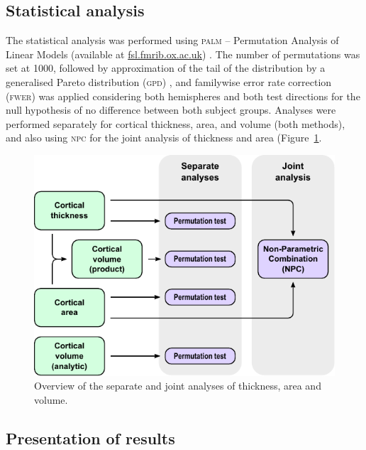 \subsection{Statistical analysis}

The statistical analysis was performed using \textsc{palm} -- Permutation Analysis of Linear Models (available at \href{http://fsl.fmrib.ox.ac.uk}{fsl.fmrib.ox.ac.uk}) \citep{Winkler2014, Winkler2016_npc}. The number of permutations was set at 1000, followed by approximation of the tail of the distribution by a generalised Pareto distribution (\textsc{gpd}) \citep{Winkler2016_fast}, and familywise error rate correction (\textsc{fwer}) was applied considering both hemispheres and both test directions for the null hypothesis of no difference between both subject groups. Analyses were performed separately for cortical thickness, area, and volume (both methods), and also using \textsc{npc} for the joint analysis of thickness and area (Figure~\ref{fig:flowstats}.

\begin{figure}[tp!]
\begin{center}
\includegraphics{figures/flowstats.pdf}
\caption{Overview of the separate and joint analyses of thickness, area and volume.}
\label{fig:flowstats}
\end{center}
\end{figure}

\subsection{Presentation of results}

